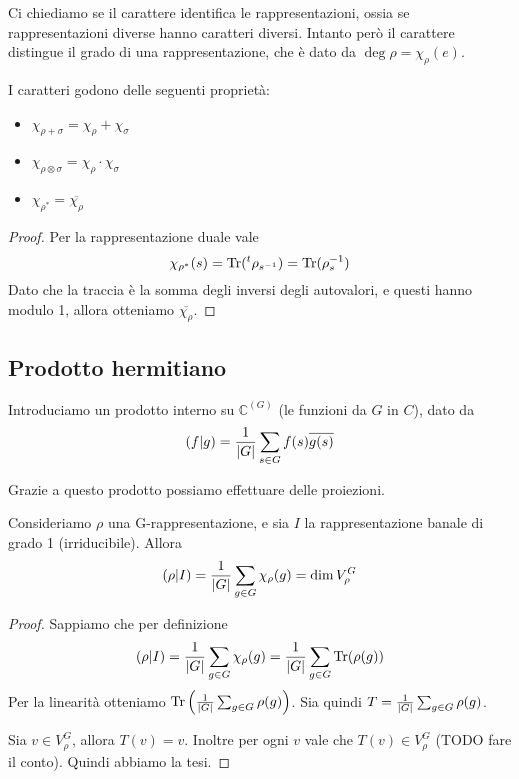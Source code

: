 \documentclass[a4paper,10pt,oneside]{math_article}
\newcommand{\herm}[2]{\left(#1 | #2\right)}
\newcommand{\id}{I}
\let\conj\overline
\begin{document}
    Ci chiediamo se il carattere identifica le rappresentazioni, ossia se rappresentazioni diverse hanno caratteri diversi.
    Intanto però il carattere distingue il grado di una rappresentazione, che è dato da $\deg \rho = \chi_\rho(e)$.
 
    \begin{mylemma}
    I caratteri godono delle seguenti proprietà:
      \begin{itemize}
      \item $\chi_{\rho+\sigma}=\chi_\rho+\chi_\sigma$     
      \item $\chi_{\rho\otimes\sigma}=\chi_\rho\cdot\chi_\sigma$
      \item $\chi_{\rho^*} = \conj{\chi_\rho}$
      \end{itemize}
    \end{mylemma}
    \begin{proof}
     Per la rappresentazione duale vale 
     \[
      \chi_{\rho^*}(s)=\operatorname{Tr} (\prescript{t}{}{\rho}_{s^{-1}})=\operatorname{Tr} (\rho_s^{-1})
     \]
     Dato che la traccia è la somma degli inversi degli autovalori, e questi hanno modulo 1, allora otteniamo $\conj{\chi_\rho}$. 

    \end{proof}

    
    \subsection{Prodotto hermitiano}
    Introduciamo un prodotto interno su $\mathbb C^{(G)}$ (le funzioni da $G$ in $C$), dato da 
    \[
     \herm fg = \frac 1{\abs G} \sum_{s\in G} f(s)\conj{g(s)}
    \]
    
    Grazie a questo prodotto possiamo effettuare delle proiezioni.
    
    \begin{myexample}
     Consideriamo $\rho$ una G-rappresentazione, e sia $\id$ la rappresentazione banale di grado 1 (irriducibile). Allora 
     \[
      \herm \rho\id = \frac 1{\abs G}\sum_{g\in G} \chi_\rho(g) = \dim V_\rho^G
     \]    
    \end{myexample}
    \begin{proof}
     Sappiamo che per definizione
     \[
      \herm \rho\id = \frac 1{\abs G}\sum_{g\in G} \chi_\rho(g) = \frac 1{\abs G}\sum_{g\in G} \Tr(\rho(g)) 
     \]
     Per la linearità otteniamo $\operatorname{Tr}\left(\frac 1{\left|G\right|}\sum_{g\in G}\rho(g)\right)$. Sia quindi $T=\frac 1{\left|G\right|}\sum_{g\in G}\rho(g)$.
     
     Sia $v \in V^G_\rho$, allora $T(v)=v$. Inoltre per ogni $v$ vale che $T(v) \in V^G_\rho$ (TODO fare il conto). Quindi abbiamo la tesi.
     
    \end{proof}
    
\end{document}
